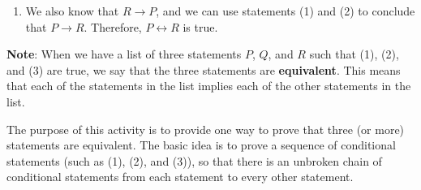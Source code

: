 \documentclass[11pt]{article}
\begin{document}
\begin{enumerate}
\begin{enumerate}
\item We also know that  $R \to P$, and we can use statements (1) and (2) to conclude that  
$P \to R$.  Therefore,  $P \leftrightarrow R$  is true.
\end{enumerate}

\textbf{Note}:
When we have a list of three statements  $P$, $Q$,  and  $R$  such that  (1), (2), and (3) are true, we say that the three statements are \textbf{equivalent}.  This means that each of the statements in the list implies each of the other statements in the list.  

The purpose of this activity is to provide one way to prove that three (or more) statements are equivalent.  The basic idea is to prove a sequence of conditional statements (such as (1), (2), and (3)), so that there is an unbroken chain of conditional statements from each statement to every other statement.
\end{enumerate}
\hbreak
\end{document}
